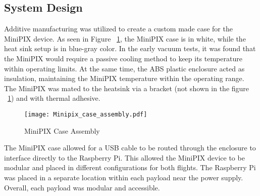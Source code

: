 \subsection{System Design}
Additive manufacturing was utilized to create a custom made case for the MiniPIX device.  As seen in Figure ~\ref{fig:minipix_case}, the MiniPIX case is in white, while the heat sink setup is in blue-gray color.  In the early vacuum tests, it was found that the MiniPIX would require a passive cooling method to keep its temperature within operating limits.  At the same time, the ABS plastic enclosure acted as insulation, maintaining the MiniPIX temperature within the operating range.  The MiniPIX was mated to the heatsink via a bracket (not shown in the figure ~\ref{fig:minipix_case}) and with thermal adhesive.
\begin{figure}[H]
    \centering
    \texttt{[image: Minipix\_case\_assembly.pdf]} %
    \caption{MiniPIX Case Assembly}
    \label{fig:minipix_case}
\end{figure}
The MiniPIX case allowed for a USB cable to be routed through the enclosure to interface directly to the Raspberry Pi.  This allowed the MiniPIX device to be modular and placed in different configurations for both flights.  The Raspberry Pi was placed in a separate location within each payload near the power supply.  Overall, each payload was modular and accessible.



